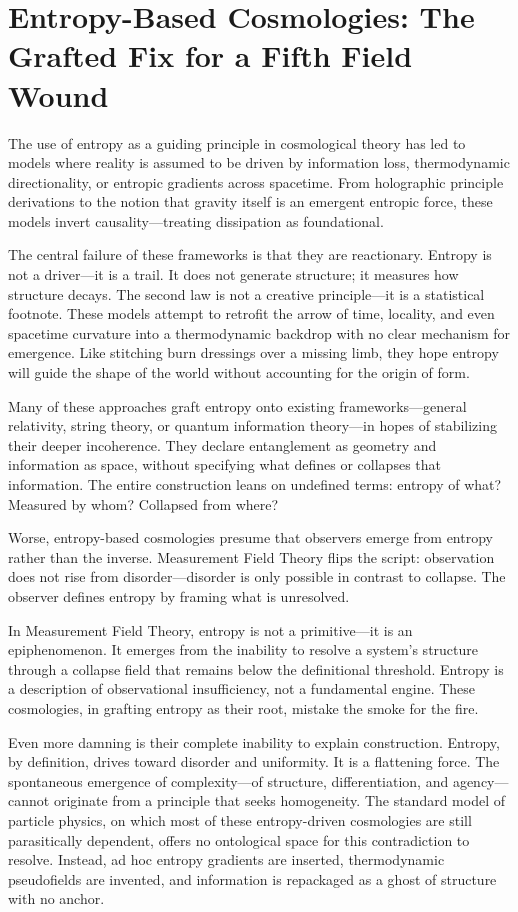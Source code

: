 \section{Entropy-Based Cosmologies: The Grafted Fix for a Fifth Field Wound}
The use of entropy as a guiding principle in cosmological theory has led to models where reality is assumed to be driven by information loss, thermodynamic directionality, or entropic gradients across spacetime. From holographic principle derivations to the notion that gravity itself is an emergent entropic force, these models invert causality—treating dissipation as foundational.

The central failure of these frameworks is that they are reactionary. Entropy is not a driver—it is a trail. It does not generate structure; it measures how structure decays. The second law is not a creative principle—it is a statistical footnote. These models attempt to retrofit the arrow of time, locality, and even spacetime curvature into a thermodynamic backdrop with no clear mechanism for emergence. Like stitching burn dressings over a missing limb, they hope entropy will guide the shape of the world without accounting for the origin of form.

Many of these approaches graft entropy onto existing frameworks—general relativity, string theory, or quantum information theory—in hopes of stabilizing their deeper incoherence. They declare entanglement as geometry and information as space, without specifying what defines or collapses that information. The entire construction leans on undefined terms: entropy of what? Measured by whom? Collapsed from where?

Worse, entropy-based cosmologies presume that observers emerge from entropy rather than the inverse. Measurement Field Theory flips the script: observation does not rise from disorder—disorder is only possible in contrast to collapse. The observer defines entropy by framing what is unresolved.

In Measurement Field Theory, entropy is not a primitive—it is an epiphenomenon. It emerges from the inability to resolve a system’s structure through a collapse field that remains below the definitional threshold. Entropy is a description of observational insufficiency, not a fundamental engine. These cosmologies, in grafting entropy as their root, mistake the smoke for the fire.

Even more damning is their complete inability to explain construction. Entropy, by definition, drives toward disorder and uniformity. It is a flattening force. The spontaneous emergence of complexity—of structure, differentiation, and agency—cannot originate from a principle that seeks homogeneity. The standard model of particle physics, on which most of these entropy-driven cosmologies are still parasitically dependent, offers no ontological space for this contradiction to resolve. Instead, ad hoc entropy gradients are inserted, thermodynamic pseudofields are invented, and information is repackaged as a ghost of structure with no anchor. 

